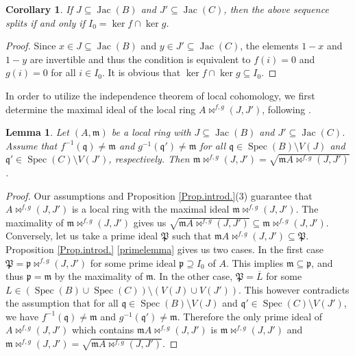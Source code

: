 \documentclass{amsart}%
\theoremstyle{plain}
\newtheorem{corollary}{Corollary}[section]
\newtheorem{lemma}{Lemma}[section]
\numberwithin{equation}{section}
\theoremstyle{definition}
\DeclareMathOperator{\jac}{Jac}
\DeclareMathOperator{\spec}{Spec}
\begin{document}
\begin{corollary}
    If $J\subseteq \jac(B)$ and $J'\subseteq \jac(C)$, then the above sequence splits if and only if $I_0= \ker f\cap\ker g$.
\end{corollary}
\begin{proof}
    Since $x\in J\subseteq \jac (B)$ and $y\in J'\subseteq\jac(C)$, the elements $1-x$ and $1-y$ are invertible and thus the condition is equivalent to $f(i)=0$ and $g(i)=0$ for all $i\in I_0$. It is obvious that $\ker f\cap \ker g\subseteq I_0$.
\end{proof}

In order to utilize the independence theorem of local cohomology, we first determine the maximal ideal of the local ring $A\bowtie^{f,g}(J,J')$, following \cite{iranlilar}.

\begin{lemma}\label{radicallemma}
    Let $(A,\mathfrak{m})$ be a local ring with $J\subseteq \jac(B)$ and $J'\subseteq \jac(C)$. Assume that $f^{-1}(\mathfrak{q}) \neq \mathfrak{m}$ and $g^{-1}(\mathfrak{q}') \neq \mathfrak{m}$ for all $\mathfrak{q}\in \spec (B)\setminus V(J)$ and $\mathfrak{q}'\in\spec (C)\setminus V(J')$, respectively. Then $\mathfrak{m}\bowtie^{f,g}(J,J')=\sqrt{\mathfrak{m}A\bowtie^{f,g}(J,J')}$.
\end{lemma}
\begin{proof}
    Our assumptions and Proposition \ref{Prop.introd.}(3) guarantee that $A\bowtie^{f,g}(J,J')$ is a local ring with the maximal ideal $\mathfrak{m}\bowtie^{f,g}(J,J')$. The maximality of $\mathfrak{m}\bowtie^{f,g}(J,J')$ gives us $\sqrt{\mathfrak{m}A\bowtie^{f,g}(J,J')}\subseteq \mathfrak{m}\bowtie^{f,g}(J,J')$. Conversely, let us take a prime ideal $\mathfrak{P}$ such that $\mathfrak{m}A\bowtie^{f,g}(J,J')\subseteq \mathfrak{P}$. Proposition \ref{Prop.introd.} \ref{primelemma} gives us two cases. In the first case $\mathfrak{P}=\mathfrak{p}\bowtie^{f,g}(J,J')$ for some prime ideal $\mathfrak{p}\supseteq I_0$ of $A$. This implies $\mathfrak{m}\subseteq \mathfrak{p}$, and thus $\mathfrak{p}=\mathfrak{m}$ by the maximality of $\mathfrak{m}$. In the other case, $\mathfrak{P}=\overline{L}$ for some $L\in(\spec(B)\cup\spec(C))\setminus(V(J)\cup V(J'))$. This however contradicts the assumption that for all $\mathfrak{q}\in \spec (B)\setminus V(J)$ and $\mathfrak{q}'\in\spec (C)\setminus V(J')$, we have $f^{-1}(\mathfrak{q})\neq \mathfrak{m}$ and $g^{-1}(\mathfrak{q}')\neq \mathfrak{m}$. Therefore the only prime ideal of $A\bowtie^{f,g}(J,J')$ which contains $\mathfrak{m}A\bowtie^{f,g}(J,J')$ is $\mathfrak{m}\bowtie^{f,g}(J,J')$ and $\mathfrak{m}\bowtie^{f,g}(J,J')=\sqrt{\mathfrak{m}A\bowtie^{f,g}(J,J')}$.
\end{proof}
\end{document}
